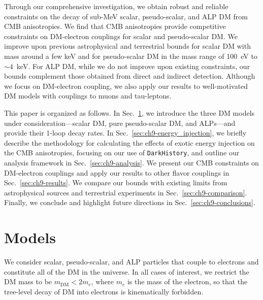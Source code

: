Through our comprehensive investigation, we obtain robust and reliable constraints on the decay of sub-MeV scalar, pseudo-scalar, and ALP DM from CMB anisotropies.
We find that CMB anisotropies provide competitive constraints on DM-electron couplings for scalar and pseudo-scalar DM.
We improve upon previous astrophysical and terrestrial bounds for scalar DM with mass around a few keV and for pseudo-scalar DM in the mass range of 100~eV to $\sim 4$~keV.
For ALP DM, while we do not improve upon existing constraints, our bounds complement those obtained from direct and indirect detection.
Although we focus on DM-electron coupling, we also apply our results to well-motivated DM models with couplings to muons and tau-leptons.

This paper is organized as follows.
In Sec.~\ref{sec:ch9-models}, we introduce the three DM models under consideration---scalar DM, pure pseudo-scalar DM, and ALPs---and provide their 1-loop decay rates.
In Sec.~\ref{sec:ch9-energy_injection}, we briefly describe the methodology for calculating the effects of exotic energy injection on the CMB anisotropies, focusing on our use of \texttt{DarkHistory}, and outline our analysis framework in Sec.~\ref{sec:ch9-analysis}.
We present our CMB constraints on DM-electron couplings and apply our results to other flavor couplings in Sec.~\ref{sec:ch9-results}.
We compare our bounds with existing limits from astrophysical sources and terrestrial experiments in Sec.~\ref{sec:ch9-comparison}.
Finally, we conclude and highlight future directions in Sec.~\ref{sec:ch9-conclusions}.

\section{Models}
\label{sec:ch9-models}

We consider scalar, pseudo-scalar, and ALP particles that couple to electrons and constitute all of the DM in the universe.
In all cases of interest, we restrict the DM mass to be $m_\mathrm{DM} < 2 m_e$, where $m_e$ is the mass of the electron, so that the tree-level decay of DM into electrons is kinematically forbidden.

